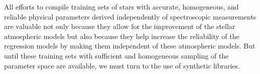 All efforts to compile training sets of stars with accurate,
homogeneous, and reliable physical parameters derived independently of
spectroscopic measurements are valuable not only because they allow
for the improvement of the stellar atmospheric models but also because
they help increase the reliability of the regression models by making
them independent of these atmospheric models. But until these training
sets with sufficient and homogeneous sampling of the parameter space
are available, we must turn to the use of synthetic libraries.
